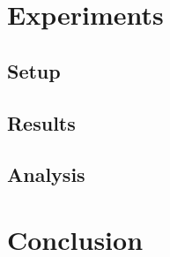 \documentclass[11pt,a4paper,oneside]{article}
\begin{document}
\section{Experiments}

\subsection{Setup}
\subsection{Results}
\subsection{Analysis}

\section{Conclusion}

\newpage


\nocite{*}
\end{document}
